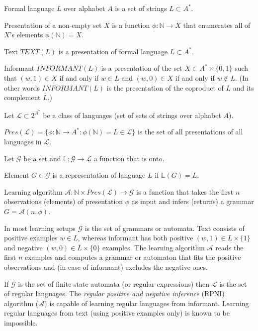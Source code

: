 \documentclass[oneside,english,logo]{amuthesis}
\begin{document}
\begin{definition}
Formal language $L$ over alphabet $A$ is a set of strings $L\subset A^*$.
\end{definition}
\begin{definition}
Presentation of a non-empty set $X$ is a function $\phi:\mathbb{N}\rightarrow X$ that enumerates all of $X$'s elements $\phi(\mathbb{N})=X$.
\end{definition}
\begin{definition}
Text $TEXT(L)$ is a presentation of formal language $L \subset A^*$.
\end{definition}
\begin{definition}
Informant $INFORMANT(L)$ is a presentation of the set $X \subset A^*\times \{0,1\}$ such that $(w,1) \in X$ if and only if  $w \in L$ and $(w,0) \in X$ if and only if $w \notin L$. (In other words $INFORMANT(L)$ is the presentation of the coproduct of $L$ and its complement $\overline{L}$.)
\end{definition}
Let $\mathcal{L}\subset 2^{A^*}$ be a class of languages (set of sets of strings over alphabet $A$). 
\begin{definition}
$Pres(\mathcal{L})=\{\phi:\mathbb{N}\rightarrow A^* : \phi(\mathbb{N}) = L \in \mathcal{L}\}$ is the set of all presentations of all languages in $\mathcal{L}$.
\end{definition}
Let $\mathcal{G}$ be a set and $\mathbb{L}:\mathcal{G}\rightarrow\mathcal{L}$ a function that is onto.
\begin{definition}
Element $G\in \mathcal{G}$ is a representation of language $L$ if $\mathbb{L}(G)=L$.
\end{definition}
\begin{definition}
Learning algorithm $\mathcal{A}:\mathbb{N} \times Pres(\mathcal{L}) \rightarrow \mathcal{G}$ is a function that takes the first $n$ observations (elements) of presentation $\phi$ as input and infers (returns) a grammar $G=\mathcal{A}(n, \phi)$.
\end{definition}
In most learning setups $\mathcal{G}$ is the set of grammars or automata. Text consists of positive examples $w \in L$, whereas informant has both positive $(w,1) \in L \times \{1\}$ and negative $(w,0) \in \bar{L} \times \{0\}$ examples. The learning algorithm $\mathcal{A}$ reads the first $n$ examples and computes a grammar or automaton that fits the positive observations and (in case of informant) excludes the negative ones.
\begin{example}
If $\mathcal{G}$ is the set of finite state automata (or regular expressions) then $\mathcal{L}$ is the set of regular languages. The \textit{regular positive and negative inference} (RPNI) \cite{deLaHiguera} algorithm ($\mathcal{A}$) is capable of learning regular languages from informant. Learning regular languages from text (using positive examples only) is known to be impossible. 
\end{example}
\end{document}
